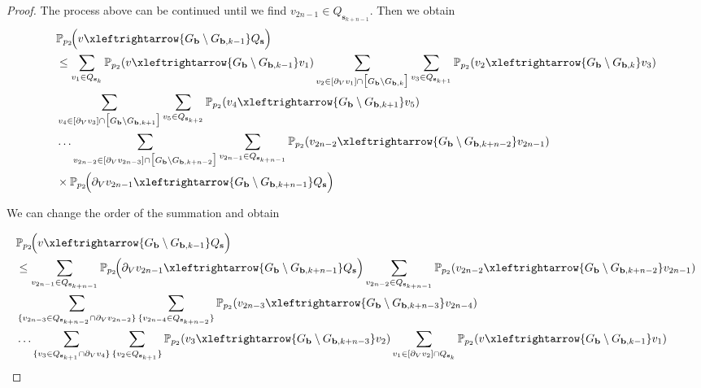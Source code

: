 \documentclass[11pt]{amsart}
\theoremstyle{plain}
\numberwithin{equation}{section}
\numberwithin{figure}{section}
\newcommand\PP{{\mathbb P}}
\begin{document}
\begin{proof}
The process above can be continued until we find $v_{2n-1}\in Q_{\mathbf{s}_{k+n-1}}$. Then we obtain
\begin{align*}
&\PP_{p_2}\!\Bigl(
v\xleftrightarrow{ G_{\mathbf b}\setminus G_{\mathbf b,k-1}}
Q_{\mathbf s}
\Bigr)\\
&\leq \sum_{v_1\in Q_{\mathbf s_{k}}}\mathbb{P}_{p_2}(v\xleftrightarrow{G_{\mathbf b}\setminus G_{\mathbf b,k-1}}v_1)
\sum_{v_2\in [\partial_Vv_1]\cap \big[ G_{\mathbf b}\setminus G_{\mathbf b,k}\big]}\sum_{v_3\in Q_{\mathbf{s}_{k+1}}}\PP_{p_2}(v_2\xleftrightarrow{G_{\mathbf{b}}\setminus G_{\mathbf{b},k}} v_3)
\\
&\sum_{v_4\in [\partial_Vv_3]\cap \big[ G_{\mathbf b}\setminus G_{\mathbf b,k+1}\big]}\sum_{v_5\in Q_{\mathbf{s}_{k+2}}}\PP_{p_2}(v_{4}\xleftrightarrow{G_{\mathbf{b}}\setminus G_{\mathbf{b},k+1}} v_5)\\
&\ldots\sum_{v_{2n-2}\in [\partial_Vv_{2n-3}]\cap \big[G_{\mathbf b}\setminus G_{\mathbf b,k+n-2}\big]}\sum_{v_{2n-1}\in Q_{\mathbf{s}_{k+n-1}}}\PP_{p_2}(v_{2n-2}\xleftrightarrow{G_{\mathbf{b}}\setminus G_{\mathbf{b},k+n-2}} v_{2n-1})
\\&\times\PP_{p_2}\!\Bigl(\partial_V v_{2n-1}
\xleftrightarrow{ G_{\mathbf b}\setminus G_{\mathbf b,k+n-1}}Q_{\mathbf s}
\Bigr)
\end{align*}


We can change the order of the summation and obtain

\begin{align*}
&\PP_{p_2}\!\Bigl(
v\xleftrightarrow{ G_{\mathbf b}\setminus G_{\mathbf b,k-1}}
Q_{\mathbf s}
\Bigr)\\
&\leq \sum_{v_{2n-1}\in Q_{\mathbf{s}_{k+n-1}}}\PP_{p_2}\!\Bigl(\partial_V v_{2n-1}
\xleftrightarrow{ G_{\mathbf b}\setminus G_{\mathbf b,k+n-1}}Q_{\mathbf s}
\Bigr)\sum_{v_{2n-2}\in Q_{\mathbf{s}_{k+n-1}}}\PP_{p_2}(v_{2n-2}\xleftrightarrow{G_{\mathbf{b}}\setminus G_{\mathbf{b},{k+n-2}}} v_{2n-1})\\
&\sum_{\{v_{2n-3}\in Q_{\mathbf{s}_{k+n-2}}\cap \partial_V v_{2n-2}\}}
\sum_{\{v_{2n-4}\in Q_{\mathbf{s}_{k+n-2}}\}}
\PP_{p_2}(v_{2n-3}\xleftrightarrow{G_{\mathbf{b}}\setminus G_{\mathbf{b},{k+n-3}}} v_{2n-4})\\
&\ldots \sum_{\{v_{3}\in Q_{\mathbf{s}_{k+1}}\cap \partial_V v_{4}\}}
\sum_{\{v_{2}\in Q_{\mathbf{s}_{k+1}}\}}
\PP_{p_2}(v_{3}\xleftrightarrow{G_{\mathbf{b}}\setminus G_{\mathbf{b},{k+n-3}}} v_{2})\sum_{v_1\in [\partial_V v_2]\cap Q_{\mathbf{s}_k}}\mathbb{P}_{p_2}(v\xleftrightarrow{G_{\mathbf b}\setminus G_{\mathbf b,k-1}}v_1)
\end{align*}




\end{proof}
\end{document}
